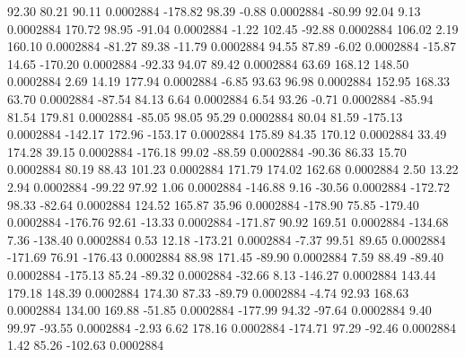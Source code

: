        92.30       80.21       90.11     0.0002884
     -178.82       98.39       -0.88     0.0002884
      -80.99       92.04        9.13     0.0002884
      170.72       98.95      -91.04     0.0002884
       -1.22      102.45      -92.88     0.0002884
      106.02        2.19      160.10     0.0002884
      -81.27       89.38      -11.79     0.0002884
       94.55       87.89       -6.02     0.0002884
      -15.87       14.65     -170.20     0.0002884
      -92.33       94.07       89.42     0.0002884
       63.69      168.12      148.50     0.0002884
        2.69       14.19      177.94     0.0002884
       -6.85       93.63       96.98     0.0002884
      152.95      168.33       63.70     0.0002884
      -87.54       84.13        6.64     0.0002884
        6.54       93.26       -0.71     0.0002884
      -85.94       81.54      179.81     0.0002884
      -85.05       98.05       95.29     0.0002884
       80.04       81.59     -175.13     0.0002884
     -142.17      172.96     -153.17     0.0002884
      175.89       84.35      170.12     0.0002884
       33.49      174.28       39.15     0.0002884
     -176.18       99.02      -88.59     0.0002884
      -90.36       86.33       15.70     0.0002884
       80.19       88.43      101.23     0.0002884
      171.79      174.02      162.68     0.0002884
        2.50       13.22        2.94     0.0002884
      -99.22       97.92        1.06     0.0002884
     -146.88        9.16      -30.56     0.0002884
     -172.72       98.33      -82.64     0.0002884
      124.52      165.87       35.96     0.0002884
     -178.90       75.85     -179.40     0.0002884
     -176.76       92.61      -13.33     0.0002884
     -171.87       90.92      169.51     0.0002884
     -134.68        7.36     -138.40     0.0002884
        0.53       12.18     -173.21     0.0002884
       -7.37       99.51       89.65     0.0002884
     -171.69       76.91     -176.43     0.0002884
       88.98      171.45      -89.90     0.0002884
        7.59       88.49      -89.40     0.0002884
     -175.13       85.24      -89.32     0.0002884
      -32.66        8.13     -146.27     0.0002884
      143.44      179.18      148.39     0.0002884
      174.30       87.33      -89.79     0.0002884
       -4.74       92.93      168.63     0.0002884
      134.00      169.88      -51.85     0.0002884
     -177.99       94.32      -97.64     0.0002884
        9.40       99.97      -93.55     0.0002884
       -2.93        6.62      178.16     0.0002884
     -174.71       97.29      -92.46     0.0002884
        1.42       85.26     -102.63     0.0002884
